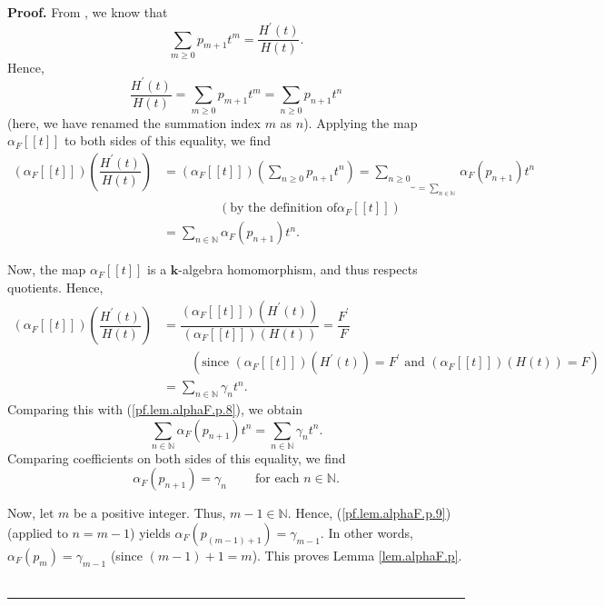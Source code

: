 \documentclass[numbers=enddot,12pt,final,onecolumn,notitlepage]{scrartcl}%
\theoremstyle{definition}
\newenvironment{proof}[1][Proof]{\noindent\textbf{#1.} }{\ \rule{0.5em}{0.5em}}
\let\sumnonlimits\sum
\renewcommand{\sum}{\sumnonlimits\limits}
\newenvironment{verlong}{}{}
\begin{document}
\begin{verlong}
\begin{proof}
From \cite[Exercise 2.5.21]{GriRei}, we know that%
\[
\sum_{m\geq0}p_{m+1}t^{m}=\dfrac{H^{\prime}\left(  t\right)  }{H\left(
t\right)  }.
\]
Hence,%
\[
\dfrac{H^{\prime}\left(  t\right)  }{H\left(  t\right)  }=\sum_{m\geq0}%
p_{m+1}t^{m}=\sum_{n\geq0}p_{n+1}t^{n}%
\]
(here, we have renamed the summation index $m$ as $n$). Applying the map
$\alpha_{F}\left[  \left[  t\right]  \right]  $ to both sides of this
equality, we find%
\begin{align}
\left(  \alpha_{F}\left[  \left[  t\right]  \right]  \right)  \left(
\dfrac{H^{\prime}\left(  t\right)  }{H\left(  t\right)  }\right)   &  =\left(
\alpha_{F}\left[  \left[  t\right]  \right]  \right)  \left(  \sum_{n\geq
0}p_{n+1}t^{n}\right)  =\underbrace{\sum_{n\geq0}}_{=\sum_{n\in\mathbb{N}}%
}\alpha_{F}\left(  p_{n+1}\right)  t^{n}\nonumber\\
&  \ \ \ \ \ \ \ \ \ \ \ \ \ \ \ \ \ \ \ \ \left(  \text{by the definition of
}\alpha_{F}\left[  \left[  t\right]  \right]  \right) \nonumber\\
&  =\sum_{n\in\mathbb{N}}\alpha_{F}\left(  p_{n+1}\right)  t^{n}.
\label{pf.lem.alphaF.p.8}%
\end{align}


Now, the map $\alpha_{F}\left[  \left[  t\right]  \right]  $ is a $\mathbf{k}%
$-algebra homomorphism, and thus respects quotients. Hence,%
\begin{align*}
\left(  \alpha_{F}\left[  \left[  t\right]  \right]  \right)  \left(
\dfrac{H^{\prime}\left(  t\right)  }{H\left(  t\right)  }\right)   &
=\dfrac{\left(  \alpha_{F}\left[  \left[  t\right]  \right]  \right)  \left(
H^{\prime}\left(  t\right)  \right)  }{\left(  \alpha_{F}\left[  \left[
t\right]  \right]  \right)  \left(  H\left(  t\right)  \right)  }%
=\dfrac{F^{\prime}}{F}\\
&  \ \ \ \ \ \ \ \ \ \ \left(  \text{since }\left(  \alpha_{F}\left[  \left[
t\right]  \right]  \right)  \left(  H^{\prime}\left(  t\right)  \right)
=F^{\prime}\text{ and }\left(  \alpha_{F}\left[  \left[  t\right]  \right]
\right)  \left(  H\left(  t\right)  \right)  =F\right) \\
&  =\sum_{n\in\mathbb{N}}\gamma_{n}t^{n}.
\end{align*}
Comparing this with (\ref{pf.lem.alphaF.p.8}), we obtain%
\[
\sum_{n\in\mathbb{N}}\alpha_{F}\left(  p_{n+1}\right)  t^{n}=\sum
_{n\in\mathbb{N}}\gamma_{n}t^{n}.
\]
Comparing coefficients on both sides of this equality, we find%
\begin{equation}
\alpha_{F}\left(  p_{n+1}\right)  =\gamma_{n}\ \ \ \ \ \ \ \ \ \ \text{for
each }n\in\mathbb{N}. \label{pf.lem.alphaF.p.9}%
\end{equation}


Now, let $m$ be a positive integer. Thus, $m-1\in\mathbb{N}$. Hence,
(\ref{pf.lem.alphaF.p.9}) (applied to $n=m-1$) yields $\alpha_{F}\left(
p_{\left(  m-1\right)  +1}\right)  =\gamma_{m-1}$. In other words, $\alpha
_{F}\left(  p_{m}\right)  =\gamma_{m-1}$ (since $\left(  m-1\right)  +1=m$).
This proves Lemma \ref{lem.alphaF.p}.
\end{proof}
\end{verlong}
\end{document}
